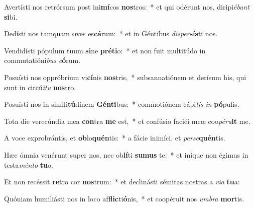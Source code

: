 \item Avertísti nos retrórsum post ini\textbf{mí}cos \textbf{nos}tros:~* et qui odérunt nos, diripi\textit{é}\textit{bant} \textbf{si}bi.
\item Dedísti nos tamquam \textbf{o}ves es\textbf{cá}rum:~* et in Géntibus \textit{di}\textit{sper}\textbf{sís}ti nos.
\item Vendidísti pópulum tuum \textbf{si}ne \textbf{pré}\textbf{ti}o:~* et non fuit multitúdo in commutatióni\textit{bus} \textit{e}\textbf{ó}rum.
\item Posuísti nos oppróbrium vi\textbf{cí}nis \textbf{nos}tris,~* subsannatiónem et derísum his, qui sunt in circú\textit{i}\textit{tu} \textbf{nos}tro.
\item Posuísti nos in simili\textbf{tú}dinem \textbf{Gén}\textbf{ti}bus:~* commotiónem cápi\textit{tis} \textit{in} \textbf{pó}pulis.
\item Tota die verecúndia mea \textbf{con}tra \textbf{me} est,~* et confúsio faciéi meæ coo\textit{pé}\textit{ru}\textbf{it} me.
\item A voce exprobrántis, et \textbf{ob}lo\textbf{quén}tis:~* a fácie inimíci, et \textit{per}\textit{se}\textbf{quén}tis.
\item Hæc ómnia venérunt super nos, nec ob\textbf{lí}ti \textbf{su}\textbf{mus} te:~* et iníque non égimus in testa\textit{mén}\textit{to} \textbf{tu}o.
\item Et non recéssit \textbf{re}tro cor \textbf{nos}trum:~* et declinásti sémitas nostras a \textit{vi}\textit{a} \textbf{tu}a:
\item Quóniam humiliásti nos in loco af\textbf{flic}ti\textbf{ó}nis,~* et coopéruit nos \textit{um}\textit{bra} \textbf{mor}tis.
